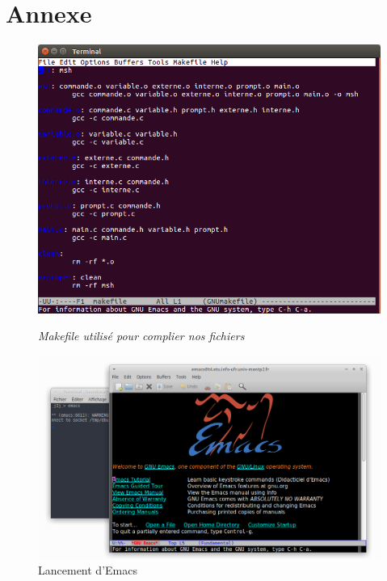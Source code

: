 \chapter{Annexe}


\begin{figure}[h!]
\begin{center}
\centering \includegraphics[scale=0.40]{figure/makefile.png}
\caption{\it Makefile utilisé pour complier nos fichiers}


\centering \includegraphics[scale=0.30]{figure/lance_prog.png}
\caption{Lancement d'Emacs}
\end{center}
\end{figure}

